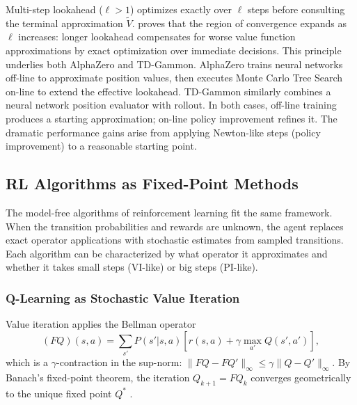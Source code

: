 Multi-step lookahead ($\ell > 1$) optimizes exactly over $\ell$ steps before consulting the terminal approximation $\tilde{V}$. \citet{bertsekas2024} proves that the region of convergence expands as $\ell$ increases: longer lookahead compensates for worse value function approximations by exact optimization over immediate decisions. This principle underlies both AlphaZero and TD-Gammon. AlphaZero trains neural networks off-line to approximate position values, then executes Monte Carlo Tree Search on-line to extend the effective lookahead. TD-Gammon similarly combines a neural network position evaluator with rollout. In both cases, off-line training produces a starting approximation; on-line policy improvement refines it. The dramatic performance gains arise from applying Newton-like steps (policy improvement) to a reasonable starting point.


\subsection{RL Algorithms as Fixed-Point Methods}
\label{sec:rl_algorithms}

The model-free algorithms of reinforcement learning fit the same framework. When the transition probabilities and rewards are unknown, the agent replaces exact operator applications with stochastic estimates from sampled transitions. Each algorithm can be characterized by what operator it approximates and whether it takes small steps (VI-like) or big steps (PI-like).

\subsubsection{Q-Learning as Stochastic Value Iteration}

Value iteration applies the Bellman operator
\begin{equation}
(FQ)(s,a) = \sum_{s'} P(s'|s,a) \left[ r(s,a) + \gamma \max_{a'} Q(s',a') \right],
\end{equation}
which is a $\gamma$-contraction in the sup-norm: $\|FQ - FQ'\|_\infty \leq \gamma\|Q - Q'\|_\infty$. By Banach's fixed-point theorem, the iteration $Q_{k+1} = FQ_k$ converges geometrically to the unique fixed point $Q^*$ \citep{bertsekas2019}.

